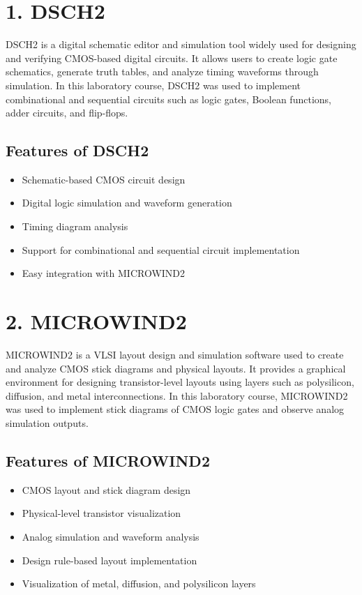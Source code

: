 \documentclass[12pt,a4paper]{report}
\begin{document}
\section*{1. DSCH2}
DSCH2 is a digital schematic editor and simulation tool widely used for designing and verifying CMOS-based digital circuits. It allows users to create logic gate schematics, generate truth tables, and analyze timing waveforms through simulation. In this laboratory course, DSCH2 was used to implement combinational and sequential circuits such as logic gates, Boolean functions, adder circuits, and flip-flops.

\subsection*{Features of DSCH2}
\begin{itemize}
    \item Schematic-based CMOS circuit design
    \item Digital logic simulation and waveform generation
    \item Timing diagram analysis
    \item Support for combinational and sequential circuit implementation
    \item Easy integration with MICROWIND2
\end{itemize}

\section*{2. MICROWIND2}
MICROWIND2 is a VLSI layout design and simulation software used to create and analyze CMOS stick diagrams and physical layouts. It provides a graphical environment for designing transistor-level layouts using layers such as polysilicon, diffusion, and metal interconnections. In this laboratory course, MICROWIND2 was used to implement stick diagrams of CMOS logic gates and observe analog simulation outputs.

\subsection*{Features of MICROWIND2}
\begin{itemize}
    \item CMOS layout and stick diagram design
    \item Physical-level transistor visualization
    \item Analog simulation and waveform analysis
    \item Design rule-based layout implementation
    \item Visualization of metal, diffusion, and polysilicon layers
\end{itemize}
\end{document}
